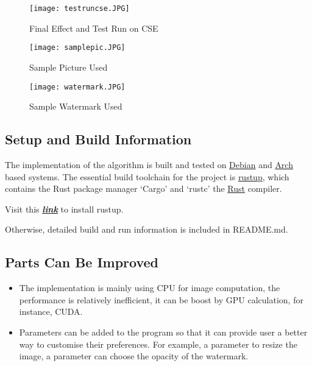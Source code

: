 \documentclass[12pt]{article}
\begin{document}
		
			\begin{figure}[H]
				\caption{Final Effect and Test Run on CSE}
				\centering
				\texttt{[image: testruncse.JPG]}\\[1cm]
			\end{figure}
		
			
			\begin{figure}[H]
				\caption{Sample Picture Used}
				\centering
				\texttt{[image: samplepic.JPG]}\\[1cm]
			\end{figure}
		
			
			\begin{figure}[H]
				\caption{Sample Watermark Used}
				\centering
				\texttt{[image: watermark.JPG]}\\[1cm]
			\end{figure}
			
	
		\subsection{Setup and Build Information}
		
				The implementation of the algorithm is built and tested on \href{https://www.debian.org/}{Debian} and \href{https://archlinux.org/}{Arch} based systems. The essential build toolchain for the project is \href{https://rustup.rs/}{rustup}, which contains the Rust package manager `Cargo' and `rustc' the \href{https://www.rust-lang.org/}{Rust} compiler.
				
				Visit this \href{https://rustup.rs/}{\textit{\textbf{link}}} to install rustup.
				
				Otherwise, detailed build and run information is included in README.md.
				
		\subsection{Parts Can Be Improved}
			\begin{itemize}
				\item The implementation is mainly using CPU for image computation, the performance is relatively inefficient, it can be boost by GPU calculation, for instance, CUDA.
				
				\item Parameters can be added to the program so that it can provide user a better way to customise their preferences. For example, a parameter to resize the image, a parameter can choose the opacity of the watermark.
			\end{itemize}
		\pagebreak
\end{document}
